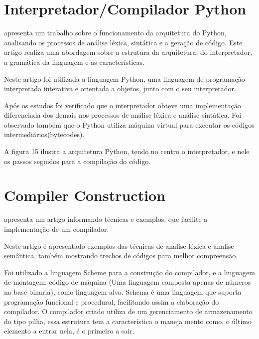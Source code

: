 \documentclass[12pt,oneside,a4paper,chapter=TITLE,section=TITLE,sumario=tradicional]{abntex2}
\begin{document}
\section{ Interpretador/Compilador Python}
\label{sec:interpretador-compilador}

\cite{eduardo2010} apresenta um trabalho sobre o funcionamento da arquitetura do Python, analisando os processos de análise léxica, sintática e a geração de código. Este artigo realiza uma abordagem sobre a estrutura da arquitetura, do interpretador, a gramática da linguagem e as características.

Neste artigo foi utilizada a linguagem Python, uma linguagem de programação interpretada interativa e orientada a objetos, junto com o seu interpretador.

Após os estudos foi verificado que o interpretador obteve uma implementação diferenciada dos demais nos processos de análise léxica e análise sintática. Foi observado também que o Python utiliza máquina virtual para executar os códigos intermediários(bytecodes).

A figura 15 ilustra a arquitetura Python, tendo no centro o interpretador, e nele os passos seguidos para a compilação do código.

\begin{figure}[htb]
\end{figure}

\section{ Compiler Construction}
\label{sec:compiler-construction}

\cite{aastha2013} apresenta um artigo informando técnicas e exemplos, que facilite a implementação de um compilador. 

Neste artigo é apresentado exemplos das técnicas de analise léxica e analise semântica, também mostrando trechos de códigos para melhor compreensão.

Foi utilizado a linguagem Scheme para a construção do compilador, e a linguagem de montagem, código de máquina (Uma linguagem composta apenas de números na base binaria), como linguagem alvo. Schema é uma linguagem que suporta programação funcional e procedural, facilitando assim a elaboração do compilador. O compilador criado utiliza de um gerenciamento de armazenamento do tipo pilha, essa estrutura tem a característica o maneja mento como, o último elemento a entrar nela, é o primeiro a sair.
\end{document}

